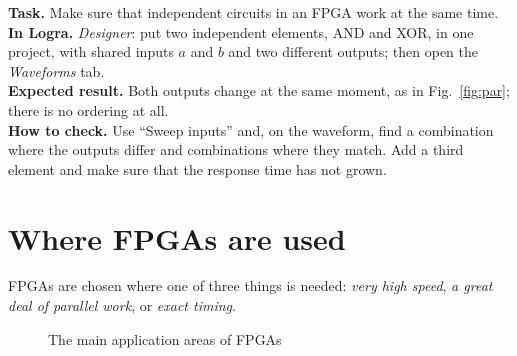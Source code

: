 \begin{diybox}
\textbf{Task.} Make sure that independent circuits in an FPGA work at the same time.\\
\textbf{In Logra.} \emph{Designer}: put two independent elements, AND and XOR, in one project, with shared inputs $a$ and $b$ and two different outputs; then open the \emph{Waveforms} tab.\\
\textbf{Expected result.} Both outputs change at the same moment, as in Fig.~\ref{fig:par}; there is no ordering at all.\\
\textbf{How to check.} Use ``Sweep inputs'' and, on the waveform, find a combination where the outputs differ and combinations where they match.  Add a third element and make sure that the response time has not grown.
\end{diybox}

\section{Where FPGAs are used}

FPGAs are chosen where one of three things is needed: \emph{very high speed},
\emph{a great deal of parallel work}, or \emph{exact timing}.

\begin{figure}[H]
\centering
{}
\caption{The main application areas of FPGAs}
\end{figure}

